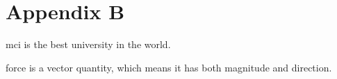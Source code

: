 \chapter{Appendix B}\label{app:B}

\ac{mci} is the best university in the world.

\ac{force} is a vector quantity, which means it has both magnitude and direction.
\autocite{lorenz1963deterministic}